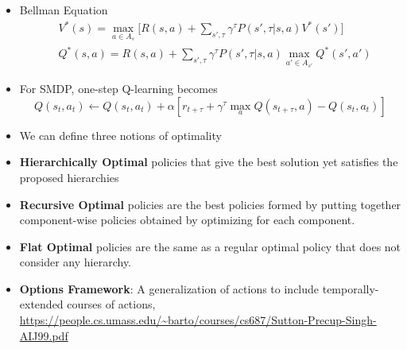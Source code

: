 \documentclass[a4paper]{article}
\begin{document}
\begin{itemize}
\begin{figure}[H]
    \end{figure}
    \item Bellman Equation
        \begin{equation*}
            \begin{split}
                &V^*(s)=\max_{a\in A_{s}}\bigg[R(s,a)+\sum_{s',\tau}\gamma^\tau P(s',\tau|s,a)V^*(s')\bigg]\\
                &Q^*(s,a)=R(s,a)+\sum_{s',\tau}\gamma^\tau P(s',\tau|s,a)\max_{a'\in A_{s'}}Q^*(s',a')
            \end{split}
        \end{equation*}
    \item For SMDP, one-step Q-learning becomes
    \begin{equation*}
        Q(s_t,a_t)\gets Q(s_t,a_t)+\alpha[r_{t+\tau}+\gamma^\tau \max_{a}Q(s_{t+\tau},a)-Q(s_t,a_t)]
    \end{equation*}
    \item We can define three notions of optimality
    \item \textbf{Hierarchically Optimal} policies that give the best solution yet satisfies the proposed hierarchies
    \item \textbf{Recursive Optimal} policies are the best policies formed by putting together component-wise policies obtained by optimizing for each component.
    \item \textbf{Flat Optimal} policies are the same as a regular optimal policy that does not consider any hierarchy.
    \item \textbf{Options Framework}: A generalization of actions to include temporally-extended courses of actions, \url{https://people.cs.umass.edu/~barto/courses/cs687/Sutton-Precup-Singh-AIJ99.pdf}

\end{itemize}
\end{document}
